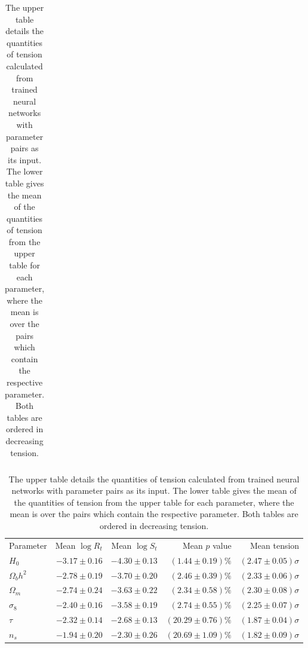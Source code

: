 \documentclass[%
 reprint,
 amsmath,amssymb,
 aps,
]{revtex4-2}
\begin{document}
\begin{table}
\begin{ruledtabular}
\begin{tabular}{l r r r r}
\end{tabular}
\rule{0pt}{5pt}
\begin{tabular}{l r r r r}
    Parameter & Mean $\log R_t$ & Mean $\log S_t $ & Mean $p$ value & Mean tension \\
    \colrule
    $H_0$           & $-3.17 \pm 0.16$ & $-4.30 \pm 0.13$ & $(1.44 \pm 0.19)\%$ & $(2.47 \pm 0.05)\sigma$ \\
    $\Omega_b h^2$  & $-2.78 \pm 0.19$ & $-3.70 \pm 0.20$ & $(2.46 \pm 0.39)\%$ & $(2.33 \pm 0.06)\sigma$ \\
    $\Omega_m$      & $-2.74 \pm 0.24$ & $-3.63 \pm 0.22$ & $(2.34 \pm 0.58)\%$ & $(2.30 \pm 0.08)\sigma$ \\
    $\sigma_8$      & $-2.40 \pm 0.16$ & $-3.58 \pm 0.19$ & $(2.74 \pm 0.55)\%$ & $(2.25 \pm 0.07)\sigma$ \\
    $\tau$          & $-2.32 \pm 0.14$ & $-2.68 \pm 0.13$ & $(20.29 \pm 0.76)\%$ & $(1.87 \pm 0.04)\sigma$ \\
    $n_s$           & $-1.94 \pm 0.20$ & $-2.30 \pm 0.26$ & $(20.69 \pm 1.09)\%$ & $(1.82 \pm 0.09)\sigma$ \\

\end{tabular}
\end{ruledtabular}
    
\caption{The upper table details the quantities of tension calculated from trained neural networks with parameter pairs as its input. The lower table gives the mean of the quantities of tension from the upper table for each parameter, where the mean is over the pairs which contain the respective parameter. Both tables are ordered in decreasing tension.}
\label{table:pairwise}
\end{table}
\end{document}
